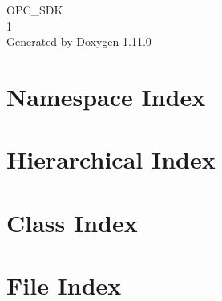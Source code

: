 \documentclass[twoside]{book}
\newcommand{\+}{\discretionary{\mbox{\scriptsize$\hookleftarrow$}}{}{}}
\newcommand{\clearemptydoublepage}{%
    \newpage{\pagestyle{empty}\cleardoublepage}%
  }
\begin{document}
  \raggedbottom
    \hypersetup{pageanchor=false,
                bookmarksnumbered=true,
                pdfencoding=unicode
               }
  \begin{titlepage}
  \vspace*{7cm}
  \begin{center}%
  {\Large OPC\+\_\+\+SDK}\\
  [1ex]\large 1 \\
  \vspace*{1cm}
  {\large Generated by Doxygen 1.11.0}\\
  \end{center}
  \end{titlepage}
  \clearemptydoublepage
  \tableofcontents
  \clearemptydoublepage
  \hypersetup{pageanchor=true}

\chapter{Namespace Index}

\chapter{Hierarchical Index}

\chapter{Class Index}

\chapter{File Index}

\end{document}
